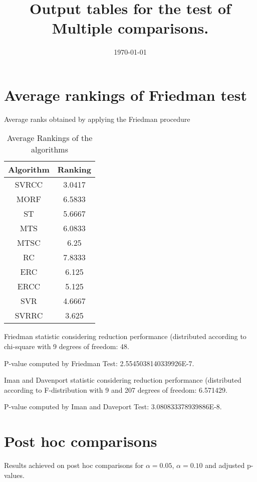 \documentclass[a4paper,10pt]{article}
\title{Output tables for the test of Multiple comparisons.}
\author{}
\date{\today}
\begin{document}
\begin{landscape}
\pagestyle{empty}
\maketitle
\thispagestyle{empty}
\section{Average rankings of Friedman test}



Average ranks obtained by applying the Friedman procedure

\begin{table}[!htp]
\centering
\begin{tabular}{|c|c|}\hline
Algorithm&Ranking\\\hline
SVRCC & 3.0417\\
MORF & 6.5833\\
ST & 5.6667\\
MTS & 6.0833\\
MTSC & 6.25\\
RC & 7.8333\\
ERC & 6.125\\
ERCC & 5.125\\
SVR & 4.6667\\
SVRRC & 3.625\\
\hline
\end{tabular}
\caption{Average Rankings of the algorithms}
\end{table}

Friedman statistic considering reduction performance (distributed according to chi-square with 9 degrees of freedom: 48.

P-value computed by Friedman Test: 2.5545038140339926E-7.\newline

Iman and Davenport statistic considering reduction performance (distributed according to F-distribution with 9 and 207 degrees of freedom: 6.571429.

P-value computed by Iman and Daveport Test: 3.080833378939886E-8.\newline



\pagebreak

\section{Post hoc comparisons}

Results achieved on post hoc comparisons for $\alpha = 0.05$, $\alpha = 0.10$ and adjusted p-values.


\end{landscape}
\end{document}
